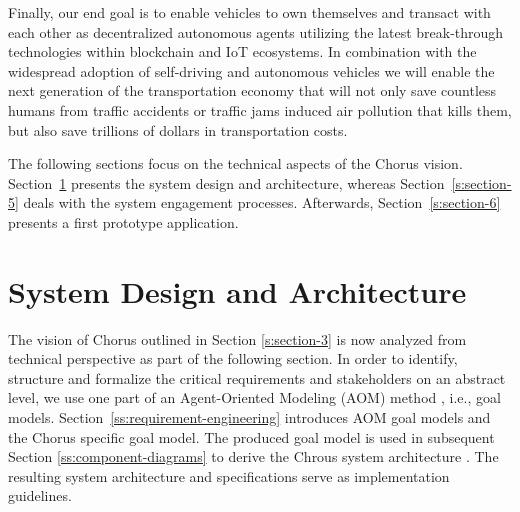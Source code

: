 \documentclass{llncs}
\begin{document}
{		Finally, our end goal is to enable vehicles to own themselves and transact with each other as decentralized autonomous agents utilizing the latest break-through technologies within blockchain and IoT ecosystems.	In combination with the widespread adoption of self-driving and autonomous vehicles we will enable the next generation of the transportation economy that will not only save countless humans from traffic accidents or traffic jams induced air pollution that kills them, but also save trillions of dollars in transportation costs. 
	
		The following sections focus on the technical aspects of the Chorus vision. Section~\ref{s:section-4} presents the system design and architecture, whereas Section~\ref{s:section-5} deals with the system engagement processes. Afterwards, Section~\ref{s:section-6} presents a first prototype application.

	
	
	\section{System Design and Architecture}
		\label{s:section-4}	


		The vision of Chorus outlined in Section \ref{s:section-3} is now analyzed from technical perspective as part of the following section. In order to identify, structure and formalize the critical requirements and stakeholders on an abstract level, we use one part of an Agent-Oriented Modeling (AOM) method \cite{sterling2009art}, i.e., goal models. Section~\ref{ss:requirement-engineering} introduces AOM goal models and the Chorus specific goal model. The produced goal model is used in subsequent Section \ref{ss:component-diagrams} to derive the Chrous system architecture . The resulting system architecture and specifications serve as implementation guidelines. 
		
		
		
}
\end{document}
